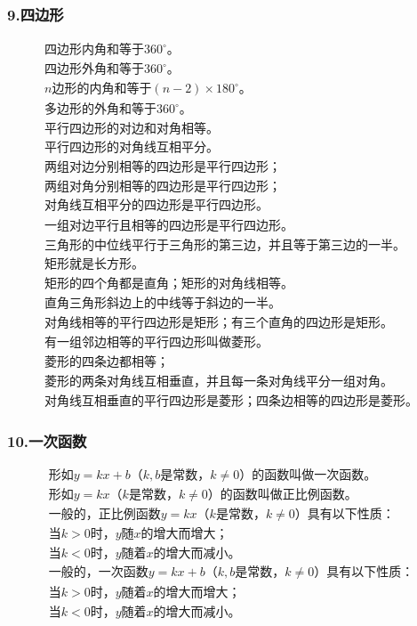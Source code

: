 \documentclass{ctexart}
\begin{document}
\subsubsection*{9.四边形}
\begin{gather*}
\text{四边形内角和等于$360^\circ$。} \\
\text{四边形外角和等于$360^\circ$。} \\
\text{$n$边形的内角和等于$(n-2)\times180^\circ$。} \\
\text{多边形的外角和等于$360^\circ$。} \\
\text{平行四边形的对边和对角相等。} \\
\text{平行四边形的对角线互相平分。} \\
\text{两组对边分别相等的四边形是平行四边形；} \\
\text{两组对角分别相等的四边形是平行四边形；} \\
\text{对角线互相平分的四边形是平行四边形。} \\
\text{一组对边平行且相等的四边形是平行四边形。} \\
\text{三角形的中位线平行于三角形的第三边，并且等于第三边的一半。} \\
\text{矩形就是长方形。} \\
\text{矩形的四个角都是直角；矩形的对角线相等。} \\
\text{直角三角形斜边上的中线等于斜边的一半。} \\
\text{对角线相等的平行四边形是矩形；有三个直角的四边形是矩形。} \\
\text{有一组邻边相等的平行四边形叫做菱形。} \\
\text{菱形的四条边都相等；} \\
\text{菱形的两条对角线互相垂直，并且每一条对角线平分一组对角。} \\
\text{对角线互相垂直的平行四边形是菱形；四条边相等的四边形是菱形。}
\end{gather*}
\subsubsection*{10.一次函数}
\begin{gather*}
\text{形如$y=kx+b$（$k, b$是常数，$k\neq0$）的函数叫做一次函数。} \\
\text{形如$y=kx$（$k$是常数，$k\neq0$）的函数叫做正比例函数。} \\
\text{一般的，正比例函数$y=kx$（$k$是常数，$k\neq0$）具有以下性质：} \\
\text{当$k>0$时，$y$随$x$的增大而增大；} \\
\text{当$k<0$时，$y$随着$x$的增大而减小。} \\
\text{一般的，一次函数$y=kx+b$（$k, b$是常数，$k\neq0$）具有以下性质：} \\
\text{当$k>0$时，$y$随着$x$的增大而增大；} \\
\text{当$k<0$时，$y$随着$x$的增大而减小。}
\end{gather*}
\end{document}
